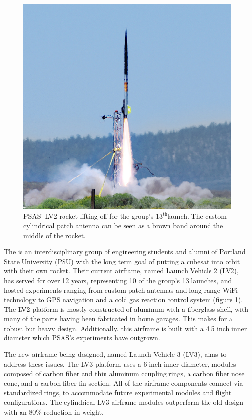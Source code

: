 \documentclass{aiaa-tc}%
\newcommand{\weightReduction}{80\%}
\begin{document}
\begin{figure}
\centering
\includegraphics[width=\linewidth]{../img/L12-cropped.png}
\caption{PSAS' LV2 rocket lifting off for the group's $13^\text{th}$launch. The custom cylindrical patch antenna can be seen as a brown band around the middle of the rocket.}
\label{fig:L-12}
\end{figure}

The  is an interdisciplinary group of engineering students and alumni of Portland State University (PSU) with the long term goal of putting a cubesat into orbit with their own rocket. 
Their current airframe, named Launch Vehicle 2 (LV2), has served for over 12 years, representing 10 of the group's 13 launches, and hosted experiments ranging from custom patch antennas and long range WiFi technology to GPS navigation and a cold gas reaction control system (figure \ref{fig:L-12}). The LV2 platform is mostly constructed of aluminum with a fiberglass shell, with many of the parts having been fabricated in home garages. This makes for a robust but heavy design. Additionally, this airframe is built with a 4.5 inch inner diameter which PSAS's experiments have outgrown. 

The new airframe being designed, named Launch Vehicle 3 (LV3), aims to address these issues. The LV3 platform uses a 6 inch inner diameter, modules composed of carbon fiber and thin aluminum coupling rings, a carbon fiber nose cone, and a carbon fiber fin section. All of the airframe components connect via standardized rings, to accommodate future experimental modules and flight configurations.
The cylindrical LV3 airframe modules outperform the old design with an \weightReduction{} reduction in weight.
\end{document}
